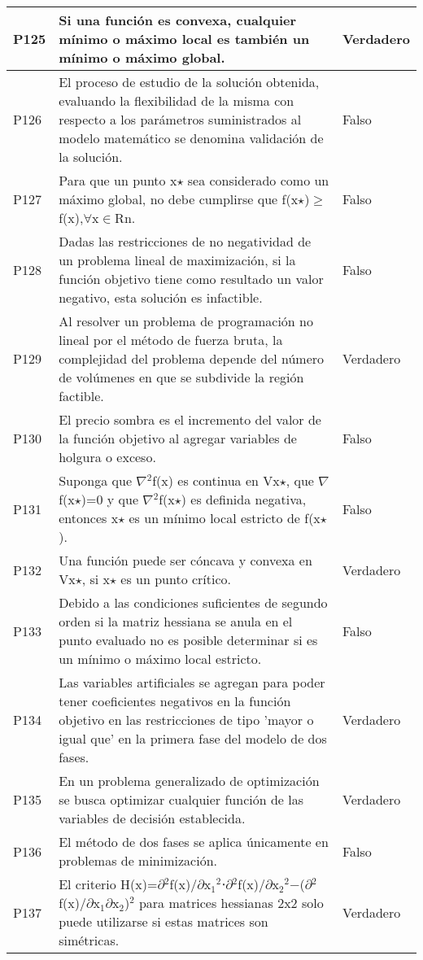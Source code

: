 \documentclass{article}
\begin{document}
\begin{longtable}{|p{1.5cm}|p{14cm}|p{2cm}|}
P125 & Si una función es convexa, cualquier mínimo o máximo local es también un mínimo o máximo global. & Verdadero \\ \hline
P126 & El proceso de estudio de la solución obtenida, evaluando la flexibilidad de la misma con respecto a los parámetros suministrados al modelo matemático se denomina validación de la solución. & Falso \\ \hline
P127 & Para que un punto x$\star$ sea considerado como un máximo global, no debe cumplirse que f(x$\star$)$\geq$f(x),$\forall$x$\in$Rn. & Falso \\ \hline
P128 & Dadas las restricciones de no negatividad de un problema lineal de maximización, si la función objetivo tiene como resultado un valor negativo, esta solución es infactible. & Falso \\ \hline
P129 & Al resolver un problema de programación no lineal por el método de fuerza bruta, la complejidad del problema depende del número de volúmenes en que se subdivide la región factible. & Verdadero \\ \hline
P130 & El precio sombra es el incremento del valor de la función objetivo al agregar variables de holgura o exceso. & Falso \\ \hline
P131 & Suponga que $\nabla$$^2$f(x) es continua en Vx$\star$, que $\nabla$f(x$\star$)=0 y que $\nabla$$^2$f(x$\star$) es definida negativa, entonces x$\star$ es un mínimo local estricto de f(x$\star$). & Falso \\ \hline
P132 & Una función puede ser cóncava y convexa en Vx$\star$, si x$\star$ es un punto crítico. & Verdadero \\ \hline
P133 & Debido a las condiciones suficientes de segundo orden si la matriz hessiana se anula en el punto evaluado no es posible determinar si es un mínimo o máximo local estricto. & Falso \\ \hline
P134 & Las variables artificiales se agregan para poder tener coeficientes negativos en la función objetivo en las restricciones de tipo 'mayor o igual que' en la primera fase del modelo de dos fases. & Verdadero \\ \hline
P135 & En un problema generalizado de optimización se busca optimizar cualquier función de las variables de decisión establecida. & Verdadero \\ \hline
P136 & El método de dos fases se aplica únicamente en problemas de minimización. & Falso \\ \hline
P137 & El criterio H(x)=$\partial$$^2$f(x)/$\partial$x$_1$$^2$⋅$\partial$$^2$f(x)/$\partial$x$_2$$^2$−($\partial$$^2$f(x)/$\partial$x$_1$$\partial$x$_2$)$^2$ para matrices hessianas 2x2 solo puede utilizarse si estas matrices son simétricas. & Verdadero \\ \hline

\end{longtable}
\end{document}
